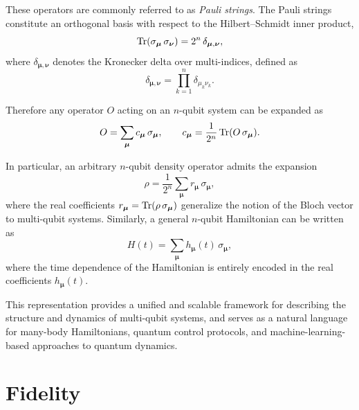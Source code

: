 These operators are commonly referred to as \emph{Pauli strings}. The Pauli strings constitute an orthogonal basis with respect to the Hilbert--Schmidt inner product,
\begin{equation}
    \Tr\!\qty(\sigma_{\boldsymbol{\mu}} \, \sigma_{\boldsymbol{\nu}}) = 2^n \, \delta_{\boldsymbol{\mu},\boldsymbol{\nu}},
\end{equation}
where $\delta_{\boldsymbol{\mu},\boldsymbol{\nu}}$ denotes the Kronecker delta over multi-indices, defined as
\begin{equation}
    \delta_{\boldsymbol{\mu},\boldsymbol{\nu}} = \prod_{k=1}^{n} \delta_{\mu_k \nu_k}.
\end{equation}

Therefore any operator $O$ acting on an $n$-qubit system can be expanded as
\begin{equation}
    O = \sum_{\boldsymbol{\mu}} c_{\boldsymbol{\mu}} \, \sigma_{\boldsymbol{\mu}},
    \qquad c_{\boldsymbol{\mu}} = \frac{1}{2^n} \Tr\!\qty(O \, \sigma_{\boldsymbol{\mu}}).
\end{equation}

In particular, an arbitrary $n$-qubit density operator admits the expansion
\begin{equation}
    \rho = \frac{1}{2^n} \sum_{\boldsymbol{\mu}} r_{\boldsymbol{\mu}} \, \sigma_{\boldsymbol{\mu}},
\end{equation}
where the real coefficients $r_{\boldsymbol{\mu}} = \Tr(\rho\,\sigma_{\boldsymbol{\mu}})$ generalize the notion of the Bloch vector to multi-qubit systems. Similarly, a general $n$-qubit Hamiltonian can be written as
\begin{equation}
    H(t) = \sum_{\boldsymbol{\mu}} h_{\boldsymbol{\mu}}(t) \, \sigma_{\boldsymbol{\mu}},
\end{equation}
where the time dependence of the Hamiltonian is entirely encoded in the real coefficients $h_{\boldsymbol{\mu}}(t)$.

This representation provides a unified and scalable framework for describing the structure and dynamics of multi-qubit systems, and serves as a natural language for many-body Hamiltonians, quantum control protocols, and machine-learning-based approaches to quantum dynamics.

\section{Fidelity}
\label{sec:fidelity}

